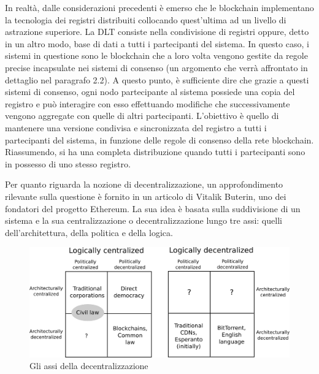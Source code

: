 In realtà, dalle considerazioni precedenti è emerso che le blockchain implementano la tecnologia dei registri distribuiti collocando quest’ultima ad un livello di astrazione superiore. La DLT consiste nella condivisione di registri oppure, detto in un altro modo, base di dati a tutti i partecipanti del sistema. In questo caso, i sistemi in questione sono le blockchain che a loro volta vengono gestite da regole precise incapsulate nei sistemi di consenso (un argomento che verrà affrontato in dettaglio nel paragrafo 2.2). A questo punto, è sufficiente dire che grazie a questi sistemi di consenso, ogni nodo partecipante al sistema possiede una copia del registro e può interagire con esso effettuando modifiche che successivamente vengono aggregate con quelle di altri partecipanti. L’obiettivo è quello di mantenere una versione condivisa e sincronizzata del registro a tutti i partecipanti del sistema, in funzione delle regole di consenso della rete blockchain. Riassumendo, si ha una completa distribuzione quando tutti i partecipanti sono in possesso di uno stesso registro.

Per quanto riguarda la nozione di decentralizzazione, un approfondimento rilevante sulla questione è fornito in un articolo di Vitalik Buterin, uno dei fondatori del progetto Ethereum. La sua idea è basata sulla suddivisione di un sistema e la sua centralizzazione o decentralizzazione lungo tre assi: quelli dell’architettura, della politica e della logica.
\\
\begin{figure}[H]
\centering
\includegraphics[width=1\textwidth]{immagini/meaning_decentralization.png}
\caption{Gli assi della decentralizzazione}
\label{fig:mesh1}

\end{figure}

